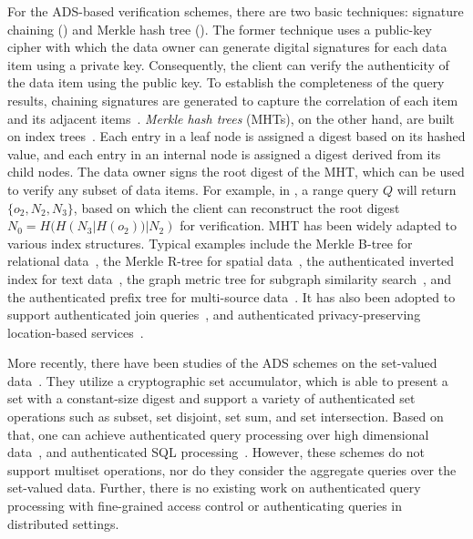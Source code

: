 For the ADS-based verification schemes, there are two basic techniques: signature chaining () and Merkle hash tree (). The former technique uses a public-key cipher with which the data owner can generate digital signatures for each data item using a private key. Consequently, the client can verify the authenticity of the data item using the public key. To establish the completeness of the query results, chaining signatures are generated to capture the correlation of each item and its adjacent items~\cite{10.1109/ICDE.2004.1320027}. \emph{Merkle hash trees} (MHTs), on the other hand, are built on index trees~\cite{10.1007/0-387-34805-0_21}. Each entry in a leaf node is assigned a digest based on its hashed value, and each entry in an internal node is assigned a digest derived from its child nodes. The data owner signs the root digest of the MHT, which can be used to verify any subset of data items. For example, in , a range query $Q$ will return $\{o_2, N_2, N_3\}$, based on which the client can reconstruct the root digest $N_0 = H( H(N_3 | H(o_2))| N_2)$ for verification. MHT has been widely adapted to various index structures. Typical examples include the Merkle B-tree for relational data~\cite{10.1145/1142473.1142488}, the Merkle R-tree for spatial data~\cite{10.1007/s00778-008-0113-2,10.1109/icde.2011.5767829}, the authenticated inverted index for text data~\cite{10.14778/1453856.1453875}, the graph metric tree for subgraph similarity search~\cite{10.1109/tkde.2014.2316818}, and the authenticated prefix tree for multi-source data~\cite{10.1145/2723372.2747649}. It has also been adopted to support authenticated join queries~\cite{10.1145/1559845.1559849}, and authenticated privacy-preserving location-based services~\cite{10.1145/2213836.2213871,10.1109/icde.2013.6544932,10.14778/2732219.2732224}.

More recently, there have been studies of the ADS schemes on the set-valued data~\cite{10.1007/978-3-642-22792-9_6,10.1007/978-3-642-54631-0_7,10.1109/eurosp.2017.35}. They utilize a cryptographic set accumulator, which is able to present a set with a constant-size digest and support a variety of authenticated set operations such as subset, set disjoint, set sum, and set intersection. Based on that, one can achieve authenticated query processing over high dimensional data~\cite{10.1145/2660267.2660373}, and authenticated SQL processing~\cite{10.1145/2810103.2813711}. However, these schemes do not support multiset operations, nor do they consider the aggregate queries over the set-valued data. Further, there is no existing work on authenticated query processing with fine-grained access control or authenticating queries in distributed settings. %


